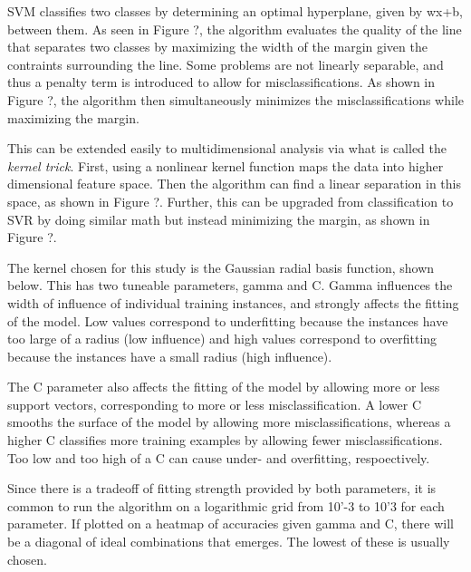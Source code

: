 SVM classifies two classes by determining an optimal hyperplane, given by wx+b,
between them.  As seen in Figure ?, the algorithm evaluates the quality of the
line that separates two classes by maximizing the width of the margin given the
contraints surrounding the line.  Some problems are not linearly separable, and
thus a penalty term is introduced to allow for misclassifications. As shown in
Figure ?, the algorithm then simultaneously minimizes the misclassifications
while maximizing the margin. 

This can be extended easily to multidimensional analysis via what is called the
\textit{kernel trick}.  First, using a nonlinear kernel function maps the data
into higher dimensional feature space. Then the algorithm can find a linear
separation in this space, as shown in Figure ?. Further, this can be upgraded
from classification to SVR by doing similar math but instead minimizing the
margin, as shown in Figure ?. 

The kernel chosen for this study is the Gaussian radial basis function, shown
below. This has two tuneable parameters, gamma and C. Gamma influences the
width of influence of individual training instances, and strongly affects the
fitting of the model. Low values correspond to underfitting because the
instances have too large of a radius (low influence) and high values correspond
to overfitting because the instances have a small radius (high influence). 

The C parameter also affects the fitting of the model by allowing more or less
support vectors, corresponding to more or less misclassification. A lower C
smooths the surface of the model by allowing more misclassifications, whereas a
higher C classifies more training examples by allowing fewer
misclassifications. Too low and too high of a C can cause under- and
overfitting, respoectively. 

Since there is a tradeoff of fitting strength provided by both parameters, it
is common to run the algorithm on a logarithmic grid from 10'-3 to 10'3 for
each parameter. If plotted on a heatmap of accuracies given gamma and C, there
will be a diagonal of ideal combinations that emerges. The lowest of these is
usually chosen. 
